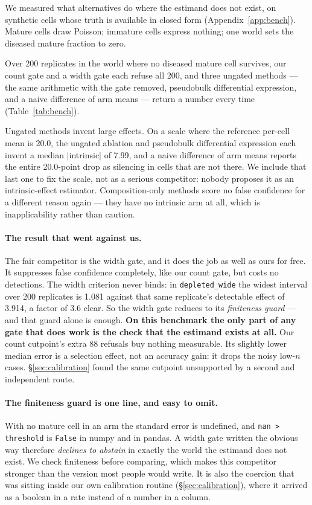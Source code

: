 We measured what alternatives do where the estimand does not exist, on synthetic
cells whose truth is available in closed form (Appendix~\ref{app:bench}). Mature
cells draw Poisson; immature cells express nothing; one world sets the diseased
mature fraction to zero.

Over 200 replicates in the world where no diseased mature cell survives, our
count gate and a width gate each refuse all 200, and three ungated methods ---
the same arithmetic with the gate removed, pseudobulk differential expression,
and a naive difference of arm means --- return a number every time
(Table~\ref{tab:bench}).

Ungated methods invent large effects. On a scale where the reference per-cell
mean is 20.0, the ungated ablation and pseudobulk differential expression each
invent a median $|$intrinsic$|$ of 7.99, and a naive difference of arm means
reports the entire 20.0-point drop as silencing in cells that are not there. We
include that last one to fix the scale, not as a serious competitor: nobody
proposes it as an intrinsic-effect estimator. Composition-only methods score no
false confidence for a different reason again --- they have no intrinsic arm at
all, which is inapplicability rather than caution.

\paragraph{The result that went against us.} The fair competitor is the width
gate, and it does the job as well as ours for free. It suppresses false
confidence completely, like our count gate, but costs no detections. The width
criterion never binds: in \texttt{depleted\_wide} the widest interval over 200
replicates is 1.081 against that same replicate's detectable effect of 3.914,
a factor of 3.6 clear.
So the width gate reduces to its \emph{finiteness guard} --- and that guard
alone is enough. \textbf{On this benchmark the only part of any gate that does
work is the check that the estimand exists at all.} Our count cutpoint's extra
88 refusals buy nothing measurable. Its slightly lower median error is a
selection effect, not an accuracy gain: it drops the noisy low-$n$ cases.
\S\ref{sec:calibration} found the same cutpoint unsupported by a second and
independent route.

\paragraph{The finiteness guard is one line, and easy to omit.} With no mature
cell in an arm the standard error is undefined, and \texttt{nan > threshold} is
\texttt{False} in numpy and in pandas. A width gate written the obvious way
therefore \emph{declines to abstain} in exactly the world the estimand does not
exist. We check finiteness before comparing, which makes this competitor
stronger than the version most people would write. It is also the coercion that
was sitting inside our own calibration routine (\S\ref{sec:calibration}), where
it arrived as a boolean in a rate instead of a number in a column.

